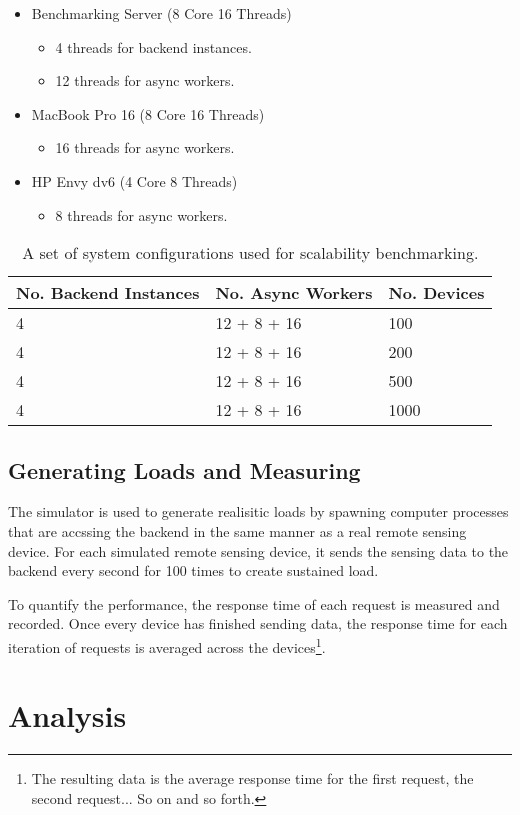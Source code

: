 \documentclass[../thesis.tex]{subfiles}
\begin{document}
\begin{itemize}
	\item Benchmarking Server (8 Core 16 Threads)
	\begin{itemize}
		\item 4 threads for backend instances.
		\item 12 threads for async workers.
	\end{itemize}
	\item MacBook Pro 16 (8 Core 16 Threads)
	\begin{itemize}
		\item 16 threads for async workers.
	\end{itemize}
	\item HP Envy dv6 (4 Core 8 Threads)
	\begin{itemize}
		\item 8 threads for async workers.
	\end{itemize}
\end{itemize}


\begin{table}[h!]
	\begin{center}
		\caption{A set of system configurations used for scalability benchmarking.}
		\label{tab:scalebench}
		\begin{tabular}{l|l|l}
			\toprule
			\textbf{No. Backend Instances} & \textbf{No. Async Workers} & \textbf{No. Devices}\\
			\midrule
			4 & 12 + 8 + 16 & 100\\
			4 & 12 + 8 + 16 & 200\\
			4 & 12 + 8 + 16 & 500\\
			4 & 12 + 8 + 16 & 1000\\
			\bottomrule
		\end{tabular}
	\end{center}
\end{table}

\subsection{Generating Loads and Measuring}

The simulator is used to generate realisitic loads by spawning computer processes that are accssing the backend in the same manner as a real remote sensing device. For each simulated remote sensing device, it sends the sensing data to the backend every second for 100 times to create sustained load. 

To quantify the performance, the response time of each request is measured and recorded. Once every device has finished sending data, the response time for each iteration of requests is averaged across the devices\footnote{The resulting data is the average response time for the first request, the second request... So on and so forth.}. 

\section{Analysis}
\end{document}
